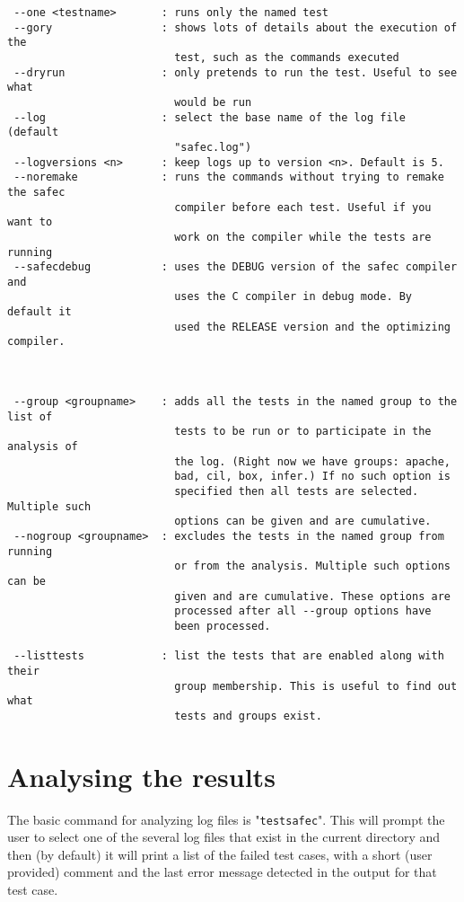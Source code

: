 \documentclass{book}
\def\t#1{{\tt #1}}
\begin{document}
\begin{verbatim}
 --one <testname>       : runs only the named test
 --gory                 : shows lots of details about the execution of the
                          test, such as the commands executed
 --dryrun               : only pretends to run the test. Useful to see what
                          would be run
 --log                  : select the base name of the log file (default
                          "safec.log")
 --logversions <n>      : keep logs up to version <n>. Default is 5.
 --noremake             : runs the commands without trying to remake the safec
                          compiler before each test. Useful if you want to 
                          work on the compiler while the tests are running
 --safecdebug           : uses the DEBUG version of the safec compiler and
                          uses the C compiler in debug mode. By default it
                          used the RELEASE version and the optimizing compiler.



 --group <groupname>    : adds all the tests in the named group to the list of 
                          tests to be run or to participate in the analysis of
                          the log. (Right now we have groups: apache,
                          bad, cil, box, infer.) If no such option is
                          specified then all tests are selected. Multiple such
                          options can be given and are cumulative. 
 --nogroup <groupname>  : excludes the tests in the named group from running
                          or from the analysis. Multiple such options can be
                          given and are cumulative. These options are
                          processed after all --group options have 
                          been processed. 

 --listtests            : list the tests that are enabled along with their
                          group membership. This is useful to find out what
                          tests and groups exist.
\end{verbatim}

 \section{Analysing the results}

 The basic command for analyzing log files is "\t{testsafec}". This will
prompt the user to select one of the several log files that exist in the
current directory and then (by default) it will print a list of the failed
test cases, with a short (user provided) comment and the last error message
detected in the output for that test case.
\end{document}
